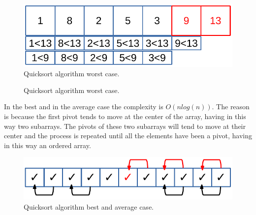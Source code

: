 \begin{figure}[H]
	\begin{center}
		\includegraphics[scale=.6]{chapters/searchandsorting/images/sorting_10.pdf}
		\caption[Quicksort algorithm worst case.]{Quicksort algorithm worst case.}
		\label{sorting_10}
	\end{center}
\end{figure}

\begin{figure}[H]
\centering
{}

\caption[Quicksort algorithm worst case.]{Quicksort algorithm worst case.}
\label{sorting_10}
\end{figure}

In the best and in the average case the complexity is \(O(n log(n))\). The reason is because the first pivot tends to move at the center of the array, having in this way two subarrays. The pivots of these two subarrays will tend to move at their center and the process is repeated until all the elements have been a pivot, having in this way an ordered array.

\begin{figure}[H]
	\begin{center}
		\includegraphics[scale=.6]{chapters/searchandsorting/images/sorting_11.pdf}
		\caption[Quicksort algorithm best and average case.]{Quicksort algorithm best and average case.}
		\label{sorting_11}
	\end{center}
\end{figure}

